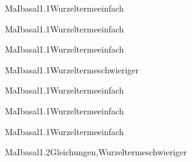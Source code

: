 \documentclass[12pt]{article}
\begin{document}
\begin{Add}{MaI}{basal1.1}{Wurzelterme}{einfach}
\end{Add}

\begin{Add}{MaI}{basal1.1}{Wurzelterme}{einfach}
\end{Add}

\begin{Add}{MaI}{basal1.1}{Wurzelterme}{einfach}
\end{Add}

\begin{Add}{MaI}{basal1.1}{Wurzelterme}{schwieriger}
\end{Add}

\begin{Add}{MaI}{basal1.1}{Wurzelterme}{einfach}
\end{Add}

\begin{Add}{MaI}{basal1.1}{Wurzelterme}{einfach}
\end{Add}

\begin{Add}{MaI}{basal1.1}{Wurzelterme}{einfach}
\end{Add}

\begin{Add}{MaI}{basal1.2}{Gleichungen,Wurzelterme}{schwieriger}
\end{Add}
\end{document}
